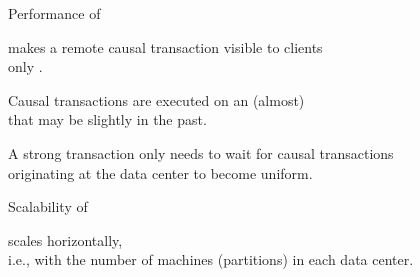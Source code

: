 \begin{frame}{Performance of \unistore{}}
  \begin{center}
    \unistore{} makes a remote causal transaction visible to clients \\[3pt]
    only .

    \vspace{0.30cm}
    Causal transactions are executed on an (almost) \\[3pt]
     that may be slightly in the past.

    \vspace{0.50cm}

    \pause
    A strong transaction only needs to wait for causal transactions \\[3pt]
    originating at the  data center to become uniform.
  \end{center}
\end{frame}

\begin{frame}{Scalability of \unistore}
  \begin{center}
    \unistore{} scales horizontally, \\[3pt]
    i.e., with the number of machines ({partitions}) in each data center.
  \end{center}
\end{frame}
